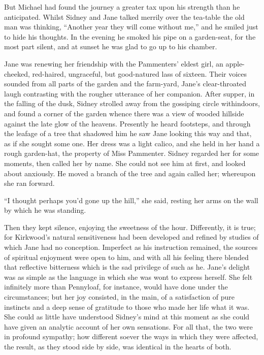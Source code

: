 But Michael had found the journey a greater tax upon his strength than
he anticipated. Whilst Sidney and Jane talked merrily over the tea-table
the old man was thinking, {}``Another year they will come without me,''
and he smiled just to hide his thoughts. In the evening he smoked his
pipe on a garden-seat, for the most part silent, and at sunset he was
glad to go up to his chamber.

Jane was renewing her friendship with the Pammenters' eldest girl, an
apple-cheeked, red-haired, ungraceful, but good-natured lass of sixteen.
Their voices sounded from all parts of the garden and the farm-yard,
Jane's clear-throated laugh contrasting with the rougher utterance of
her companion. After supper, in the falling of the dusk, Sidney strolled
away from the gossiping circle withindoors, and found a corner of the
garden whence there was a view of wooded hillside against the late glow
of the heavens. Presently he heard footsteps, and through the leafage of
a tree that shadowed him he saw Jane looking this way and that, as if
she sought some one. Her dress was a light calico, and she held in her
hand a rough garden-hat, the property of Miss Pammenter. Sidney regarded
her for some moments, then called her by name. {}She could not see him
at first, and looked about anxiously. He moved a branch of the tree and
again called her; whereupon she ran forward.

``I thought perhaps you'd gone up the hill,'' she said, resting her arms
on the wall by which he was standing.

Then they kept silence, enjoying the sweetness of the hour. Differently,
it is true; for Kirkwood's natural sensitiveness had been developed and
refined by studies of which Jane had no conception. Imperfect as his
instruction remained, the sources of spiritual enjoyment were open to
him, and with all his feeling there blended that reflective bitterness
which is the sad privilege of such as he. Jane's delight was as simple
as the language in which she was wont to express herself. She felt
infinitely more than Pennyloaf, for instance, would have done under the
circumstances; but her joy consisted, in the main, of a satisfaction of
pure instincts and a deep sense of gratitude to those who made her life
what it was. She could as little have {}understood Sidney's mind at this
moment as she could have given an analytic account of her own
sensations. For all that, the two were in profound sympathy; how
different soever the ways in which they were affected, the result, as
they stood side by side, was identical in the hearts of both.

